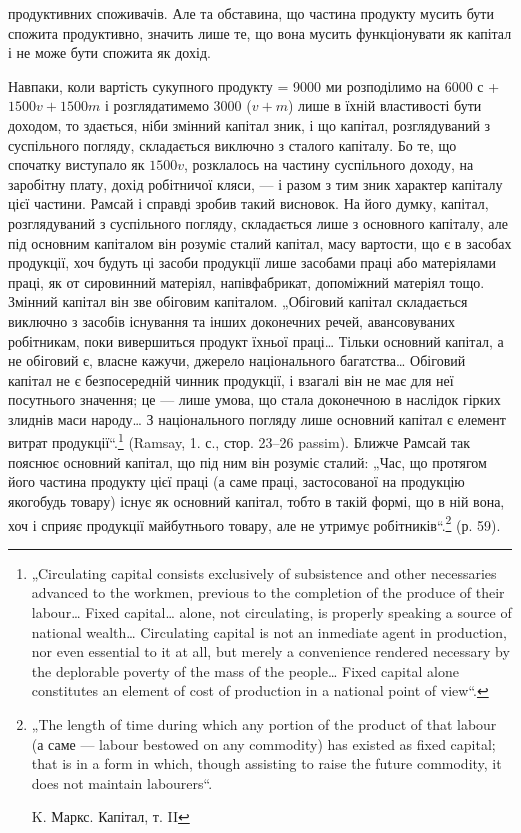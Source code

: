 продуктивних споживачів. Але та обставина, що частина продукту мусить
бути спожита продуктивно, значить лише те, що вона мусить
функціонувати як капітал і не може бути спожита як дохід.

Навпаки, коли вартість сукупного продукту = 9000 ми розподілимо
на 6000 с + $1500 v + 1500 m$ і розглядатимемо 3000 ($v + m$) лише
в їхній властивості бути доходом, то здається, ніби змінний капітал зник,
і що капітал, розглядуваний з суспільного погляду, складається виключно
з сталого капіталу. Бо те, що спочатку виступало як $1500 v$, розклалось
на частину суспільного доходу, на заробітну плату, дохід робітничої
кляси, — і разом з тим зник характер капіталу цієї частини. Рамсай
і справді зробив такий висновок. На його думку, капітал, розглядуваний
з суспільного погляду, складається лише з основного капіталу, але під
основним капіталом він розуміє сталий капітал, масу вартости, що є в
засобах продукції, хоч будуть ці засоби продукції лише засобами праці
або матеріялами праці, як от сировинний матеріял, напівфабрикат, допоміжний
матеріял тощо. Змінний капітал він зве обіговим капіталом. „Обіговий
капітал складається виключно з засобів існування та інших доконечних
речей, авансовуваних робітникам, поки вивершиться продукт
їхньої праці\dots{} Тільки основний капітал, а не обіговий є, власне кажучи,
джерело національного багатства\dots{} Обіговий капітал не є безпосередній
чинник продукції, і взагалі він не має для неї посутнього значення; це —
лише умова, що стала доконечною в наслідок гірких злиднів маси народу\dots{}
З національного погляду лише основний капітал є елемент витрат
продукції“.\footnote*{
„Circulating capital consists exclusively of subsistence and other necessaries
advanced to the workmen, previous to the completion of the produce of their labour\dots{}
Fixed capital\dots{} alone, not circulating, is properly speaking a source of national
wealth\dots{} Circulating capital is not an inmediate agent in production, nor even essential
to it at all, but merely a convenience rendered necessary by the deplorable poverty
of the mass of the people\dots{} Fixed capital alone constitutes an element of cost of
production in a national point of view“.
} (Ramsay, 1. с., стор. 23--26 passim). Ближче Рамсай так
пояснює основний капітал, що під ним він розуміє сталий: „Час, що
протягом його частина продукту цієї праці (а саме праці, застосованої на
продукцію якогобудь товару) існує як основний капітал, тобто в такій
формі, що в ній вона, хоч і сприяє продукції майбутнього товару, але
не утримує робітників“.\footnote*{
„The length of time during which any portion of the product of that labour
(а саме — labour bestowed on any commodity) has existed as fixed capital; that is
in a form in which, though assisting to raise the future commodity, it does not
maintain labourers“.

K. Маркс. Капітал, т. II
} (р. 59).

